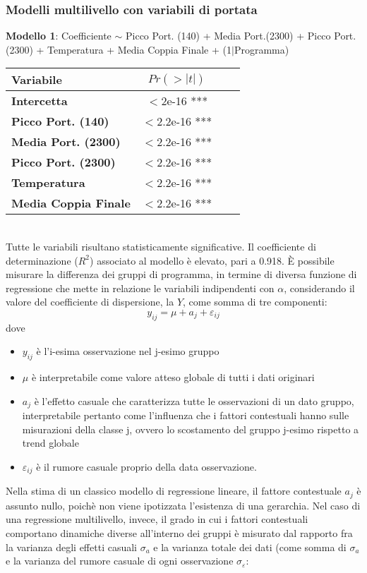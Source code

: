 \documentclass[fleqn,10pt]{SelfArx} %
\begin{document}
\subsubsection{Modelli multilivello con variabili di portata}
\textbf{Modello 1}:  Coefficiente $\sim$  Picco Port. (140) + Media Port.(2300) + Picco Port. (2300) + Temperatura + Media Coppia Finale + (1$\mid$Programma)
{\begin{table}[h] 
\centering
\begin{tabular}[t]{lccc}
\toprule 
Variabile&$Pr(> |t|)$\\
\midrule 
\textbf{Intercetta}&$<$2e-16 ***&\\
\textbf{Picco Port. (140)}&$<$2.2e-16 ***\\ 
\textbf{Media Port. (2300)}&$<$2.2e-16 ***\\ 
\textbf{Picco Port. (2300)}&$<$2.2e-16 ***\\ 
\textbf{Temperatura}&$<$2.2e-16 ***\\
\textbf{Media Coppia Finale}&$<$2.2e-16 ***\\
\bottomrule 
\end{tabular}
\end{table}}\\
Tutte le variabili risultano statisticamente significative. Il coefficiente di determinazione ($R^2$) associato al modello è elevato, pari a 0.918.
È possibile misurare la differenza dei gruppi di programma, in termine di diversa funzione di regressione che mette in relazione le variabili indipendenti con $\alpha$, considerando il valore del coefficiente di dispersione, la $Y$, come somma di tre componenti:
\begin{equation}
    y_{ij}=\mu+a_j+\varepsilon_{ij}
\end{equation}
dove
\begin{itemize}
    \item $y_{ij}$ è l'i-esima osservazione nel j-esimo gruppo 
    \item $\mu$ è interpretabile come valore atteso globale di tutti i dati originari
    \item $a_j$ è l'effetto casuale che caratterizza tutte le osservazioni di un dato gruppo, interpretabile pertanto come l'influenza che i fattori contestuali hanno sulle misurazioni della classe j, ovvero lo scostamento del gruppo j-esimo rispetto a trend globale
    \item $\varepsilon_{ij}$ è il rumore casuale proprio della data osservazione.
\end{itemize}
Nella stima di un classico modello di regressione lineare, il fattore contestuale $a_j$ è assunto nullo, poichè non viene ipotizzata l'esistenza di una gerarchia. Nel caso di una regressione multilivello, invece, il grado in cui i fattori contestuali comportano dinamiche diverse all'interno dei gruppi è misurato dal rapporto fra la varianza degli effetti casuali $\sigma_a$ e la varianza totale dei dati (come somma di $\sigma_a$ e la varianza del rumore casuale di ogni osservazione $\sigma_{\varepsilon}$:
\end{document}
